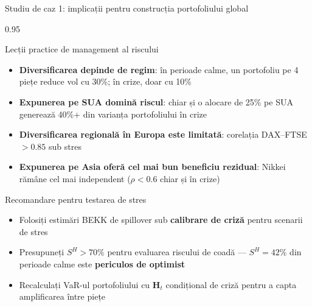 \documentclass[9pt, aspectratio=169, t]{beamer}
\begin{document}
\begin{frame}{Studiu de caz 1: implicații pentru construcția portofoliului global}
    \begin{cminipage}{0.95\textwidth}
    {\footnotesize
    \begin{block}{Lecții practice de management al riscului}
        \begin{itemize}\setlength{\itemsep}{1pt}
            \item \textbf{Diversificarea depinde de regim}: în perioade calme, un portofoliu pe 4 piețe reduce vol cu 30\%; în crize, doar cu 10\%
            \item \textbf{Expunerea pe SUA domină riscul}: chiar și o alocare de 25\% pe SUA generează 40\%+ din varianța portofoliului în crize
            \item \textbf{Diversificarea regională în Europa este limitată}: corelația DAX--FTSE $> 0.85$ sub stres
            \item \textbf{Expunerea pe Asia oferă cel mai bun beneficiu rezidual}: Nikkei rămâne cel mai independent ($\rho < 0.6$ chiar și în crize)
        \end{itemize}
    \end{block}
    \begin{alertblock}{Recomandare pentru testarea de stres}
        \begin{itemize}\setlength{\itemsep}{0pt}
            \item Folosiți estimări BEKK de spillover sub \textbf{calibrare de criză} pentru scenarii de stres
            \item Presupuneți $S^H > 70\%$ pentru evaluarea riscului de coadă --- $S^H = 42\%$ din perioade calme este \textbf{periculos de optimist}
            \item Recalculați VaR-ul portofoliului cu $\mathbf{H}_t$ condițional de criză pentru a capta amplificarea între piețe
        \end{itemize}
    \end{alertblock}
    }
    \end{cminipage}
\end{frame}
\end{document}
